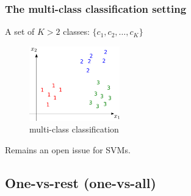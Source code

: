 \begin{frame}\frametitle{The multi-class classification setting}

A set of $K>2$ classes: $\{c_{1},c_{2},\ldots,c_{K}\}$

\begin{figure}[h]
     \centering
	 \includegraphics[width=0.35\textwidth]{img/3classes}
     \caption{multi-class classification}
	 \label{fig:multiclassification}
\end{figure}

Remains an open issue for SVMs.

\end{frame}

\subsection{One-vs-rest (one-vs-all)}

